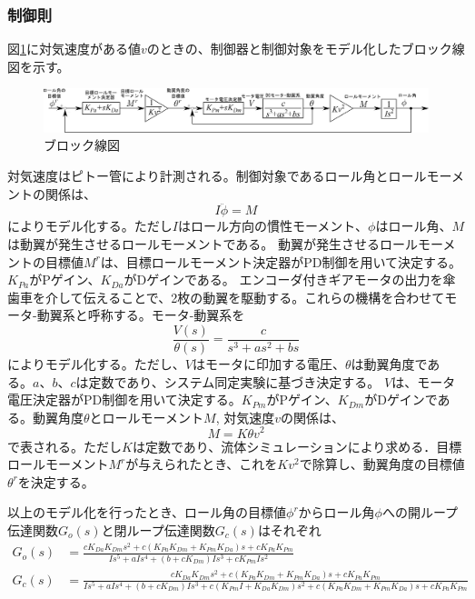 \documentclass[a4paper,11pt,uplatex]{jsarticle}
\begin{document}
\subsubsection{制御則}
図\ref{fig:ブロック線図}に対気速度がある値$v$のときの、制御器と制御対象をモデル化したブロック線図を示す。
\begin{figure}[H]
	\centering
	\includegraphics[width=0.95\linewidth]{pic_avi/block_diagram.png}
	\caption{ブロック線図}
	\label{fig:ブロック線図}
\end{figure}
対気速度はピトー管により計測される。制御対象であるロール角とロールモーメントの関係は、
\begin{equation}
	I\ddot\phi=M
\end{equation}
によりモデル化する。ただし$I$はロール方向の慣性モーメント、$\phi$はロール角、$M$は動翼が発生させるロールモーメントである。
動翼が発生させるロールモーメントの目標値$M^r$は、目標ロールモーメント決定器がPD制御を用いて決定する。$K_{Pa}$がPゲイン、$K_{Da}$がDゲインである。
エンコーダ付きギアモータの出力を傘歯車を介して伝えることで、2枚の動翼を駆動する。これらの機構を合わせてモータ-動翼系と呼称する。モータ-動翼系を
\begin{equation}
	\frac{V(s)}{\theta(s)}=\frac{c}{s^3+as^2+bs}
\end{equation}
によりモデル化する。ただし、$V$はモータに印加する電圧、$\theta$は動翼角度である。$a、b、c$は定数であり、システム同定実験に基づき決定する。
$V$は、モータ電圧決定器がPD制御を用いて決定する。$K_{Pm}$がPゲイン、$K_{Dm}$がDゲインである。動翼角度$\theta$とロールモーメント$M$, 対気速度$v$の関係は、
\begin{equation}
	M=K\theta v^2
\end{equation}
で表される。ただし$K$は定数であり、流体シミュレーションにより求める．目標ロールモーメント$M^r$が与えられたとき、これを$Kv^2$で除算し、動翼角度の目標値$\theta^r$を決定する。\par
以上のモデル化を行ったとき、ロール角の目標値$\phi^r$からロール角$\phi$への開ループ伝達関数$G_o(s)$と閉ループ伝達関数$G_c(s)$はそれぞれ
\begin{equation}
	\begin{split}
		G_{o}(s)&=\frac{cK_{Da}K_{Dm}s^2+c\left(K_{Pa}K_{Dm}+K_{Pm}K_{Da}\right)s+cK_{Pa}K_{Pm}}{Is^5+aIs^4+\left(b+cK_{Dm}\right)Is^3+cK_{Pm}Is^2}\\
		G_{c}(s)&=\frac{cK_{Da}K_{Dm}s^2+c\left(K_{Pa}K_{Dm}+K_{Pm}K_{Da}\right)s+cK_{Pa}K_{Pm}}{Is^5+aIs^4+\left(b+cK_{Dm}\right)Is^3+c\left(K_{Pm}I+K_{Da}K_{Dm}\right)s^2+c(K_{Pa}K_{Dm}+K_{Pm}K_{Da})s+cK_{Pa}K_{Pm}}
	\end{split}
\end{equation}
\end{document}
